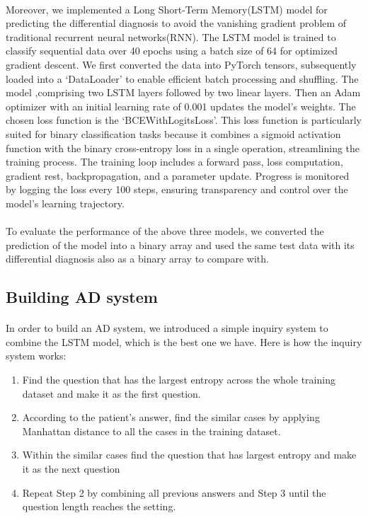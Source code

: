 \documentclass{article}
\begin{document}
\paragraph{ }
Moreover, we implemented a Long Short-Term Memory(LSTM) model for predicting the differential diagnosis to avoid the vanishing gradient problem of traditional recurrent neural networks(RNN). The LSTM model is trained to classify sequential data over 40 epochs using a batch size of 64 for optimized gradient descent. We first converted the data into PyTorch tensors, subsequently loaded into a ‘DataLoader’ to enable efficient batch processing and shuffling. The model ,comprising two LSTM layers followed by two linear layers. Then an Adam optimizer with an initial learning rate of 0.001 updates the model’s weights. The chosen loss function is the ‘BCEWithLogitsLoss’. This loss function is particularly suited for binary classification tasks because it combines a sigmoid activation function with the binary cross-entropy loss in a single operation, streamlining the training process. The training loop includes a forward pass, loss computation, gradient rest, backpropagation, and a parameter update. Progress is monitored by logging the loss every 100 steps, ensuring transparency and control over the model’s learning trajectory.

\paragraph{ }
To evaluate the performance of the above three models, we converted the prediction of the model into a binary array and used the same test data with its differential diagnosis also as a binary array to compare with.

\subsection{Building AD system}
\paragraph{ }
In order to build an AD system, we introduced a simple inquiry system to combine the LSTM model, which is the best one we have. Here is how the inquiry system works:
\begin{enumerate}
  \item Find the question that has the largest entropy across the whole training dataset and make it as the first question.
  \item According to the patient's answer, find the similar cases by applying Manhattan distance to all the cases in the training dataset.
  \item Within the similar cases find the question that has largest entropy and make it as the next question
  \item Repeat Step 2 by combining all previous answers and Step 3 until the question length reaches the setting.
\end{enumerate}
\end{document}
